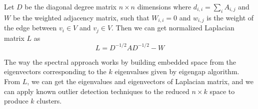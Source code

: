 Let $D$ be the diagonal degree matrix $n \times n$ dimensions where $d_{i,i} = \sum_{i} A_{i,j}$ 
and $W$ be the weighted adjacency matrix, such that $W_{i,i} = 0$ and $w_{i,j}$ is the weight of the edge between $v_i \in V$ and $v_j \in V$. 
Then we can get normalized Laplacian matrix $L$ as 
\begin{equation}
L = D^{-1/2} A D^{-1/2} - W
\end{equation}

The way the spectral approach works by building embedded space from the eigenvectors corresponding to the $k$ eigenvalues given by eigengap algorithm. 
From $L$, we can get the eigenvalues and eigenvectors of Laplacian matrix, and we can apply known outlier detection techniques \cite{knorr00} to the reduced $n \times k$ space to produce $k$ clusters. 
